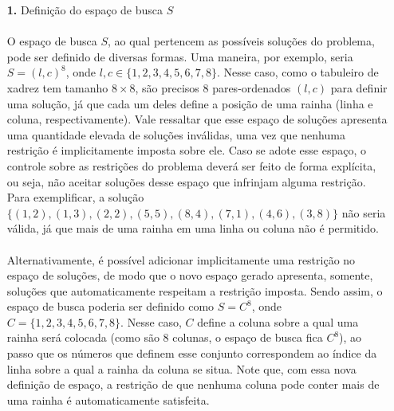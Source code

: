 \documentclass{report}
\begin{document}
\begin{itemize}

	\item[\textbf{1.}] Definição do espaço de busca $S$
	
	\paragraph{} O espaço de busca $S$, ao qual pertencem as possíveis soluções do problema, pode ser definido de diversas formas. Uma maneira, por exemplo, seria $S = (l,c)^{8}$, onde $l, c \in \{1, 2, 3, 4, 5, 6, 7, 8\}$. Nesse caso, como o tabuleiro de xadrez tem tamanho $8 \times 8$, são precisos 8 pares-ordenados $(l,c)$ para definir uma solução, já que cada um deles define a posição de uma rainha (linha e coluna, respectivamente). Vale ressaltar que esse espaço de soluções apresenta uma quantidade elevada de soluções inválidas, uma vez que nenhuma restrição é implicitamente imposta sobre ele. Caso se adote esse espaço, o controle sobre as restrições do problema deverá ser feito de forma explícita, ou seja, não aceitar soluções desse espaço que infrinjam alguma restrição. Para exemplificar, a solução $\{(1,2),(1,3),(2,2),(5,5),(8,4),(7,1),(4,6),(3,8)\}$ não seria válida, já que mais de uma rainha em uma linha ou coluna não é permitido.
	
	\paragraph{} Alternativamente, é possível adicionar implicitamente uma restrição no espaço de soluções, de modo que o novo espaço gerado apresenta, somente, soluções que automaticamente respeitam a restrição imposta. Sendo assim, o espaço de busca poderia ser definido como $S = C^{8}$, onde $C = \{1, 2, 3, 4, 5, 6, 7, 8 \}$. Nesse caso, $C$ define a coluna sobre a qual uma rainha será colocada (como são 8 colunas, o espaço de busca fica $C^{8}$), ao passo que os números que definem esse conjunto correspondem ao índice da linha sobre a qual a rainha da coluna se situa. Note que, com essa nova definição de espaço, a restrição de que nenhuma coluna pode conter mais de uma rainha é automaticamente satisfeita. 
	

\end{itemize}
\end{document}
